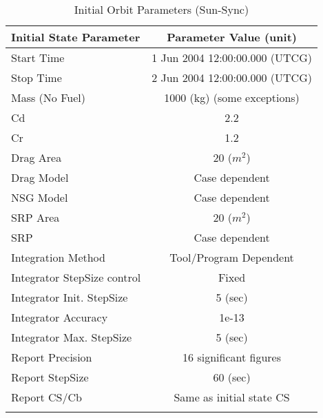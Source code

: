 \begin{table}[htbp!]
\centering \caption{Initial Orbit Parameters
(Sun-Sync)}
      \begin{tabular}{lc}
      \hline\hline
            Initial State Parameter & Parameter Value (unit)\\
            \hline
            Start Time & 1 Jun 2004 12:00:00.000 (UTCG)\\
            Stop Time & 2 Jun 2004 12:00:00.000 (UTCG)\\
            
            Mass (No Fuel) & 1000 (kg) (some exceptions)\\
            Cd & 2.2\\
            Cr & 1.2\\
            Drag Area & 20 ($m^2$)\\
            Drag Model & Case dependent\\
            NSG Model & Case dependent\\
            SRP Area & 20 ($m^2$)\\
            SRP & Case dependent\\
            Integration Method & Tool/Program Dependent\\
            Integrator StepSize control & Fixed\\
            Integrator Init. StepSize & 5 (sec)\\
            Integrator Accuracy & 1e-13\\
            Integrator Max. StepSize & 5 (sec)\\
            Report Precision & 16 significant figures\\
            Report StepSize & 60 (sec)\\
            Report CS/Cb & Same as initial state CS\\
      \hline\hline
      \label{Table: InitStateSunSync}
\end{tabular}
\end{table}
